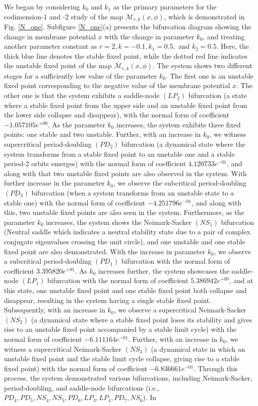 \documentclass{article}
\begin{document}
We began by considering $k_0$ and $k_1$ as the primary parameters for the codimension-1 and -2 study of the map $\mathcal{M}_{r,k}(x,\phi)$, which is demonstrated in Fig. \ref{N_one}. Subfigure \ref{N_one}(a) presents the bifurcation diagram showing the change in membrane potential $x$ with the change in parameter $k_0$, and treating another parameter constant as $r=2, k=-0.1, k_1=0.5, $ and $ k_2=0.5$. Here, the thick blue line denotes the stable fixed point, while the dotted red line indicates the unstable fixed point of the map $\mathcal{M}_{r,k}(x,\phi)$. The system shows two different stages for a sufficiently low value of the parameter $k_0$. The first one is an unstable fixed point corresponding to the negative value of the membrane potential $x$. The other one is that the system exhibits a saddle-node $(LP_2)$ bifurcation (a state where a stable fixed point from the upper side and an unstable fixed point from the lower side collapse and disappear), with the normal form of coefficient $-1.057105e^{+00}$. As the parameter $k_0$ increases, the system exhibits three fixed points: one stable and two unstable. Further, with an increase in $k_0$, we witness supercritical period-doubling $(PD_2)$ bifurcation (a dynamical state where the system transforms from a stable fixed point to an unstable one and a stable period-2 orbits emerges) with the normal form of coefficient $4.120733e^{-01}$, and along with that two unstable fixed points are also observed in the system. With further increase in the parameter $k_0$, we observe the subcritical period-doubling $(PD_3)$ bifurcation (when a system transforms from an unstable state to a stable one) with the normal form of coefficient $-4.251796e^{-01}$, and along with this, two unstable fixed points are also seen in the system. Furthermore, as the parameter $k_0$ increases, the system shows the Neimark-Sacker $(NS_1)$ bifurcation (Neutral saddle which indicates a neutral stability state due to a pair of complex conjugate eigenvalues crossing the unit circle), and one unstable and one stable fixed point are also demonstrated. With the increase in parameter $k_0$, we observe a subcritical period-doubling $(PD_1)$ bifurcation with the normal form of coefficient $3.395820e^{+01}$. As $k_0$ increases further, the system showcases the saddle-node $(LP_1)$ bifurcation with the normal form of coefficient $5.386942e^{+00}$, and at this state, one unstable fixed point and one stable fixed point both collapse and disappear, resulting in the system having a single stable fixed point. Subsequently, with an increase in $k_0$, we observe a supercritical Neimark-Sacker $(NS_2)$ (a dynamical state where a stable fixed point loses its stability and gives rise to an unstable fixed point accompanied by a stable limit cycle) with the normal form of coefficient $-6.111164e^{-01}$. Further, with an increase in $k_0$, we witness a supercritical Neimark-Sacker $(NS_3)$ (a dynamical state in which an unstable fixed point and the stable limit cycle collapse, giving rise to a stable fixed point) with the normal form of coefficient $-6.836661e^{-01}$. Through this process, the system demonstrated various bifurcations, including Neimark-Sacker, period-doubling, and saddle-node bifurcations (i.e., $PD_4, PD_5, NS_4, NS_5, PD_6, LP_3, LP_4, PD_7, NS_6$). In 
\end{document}
